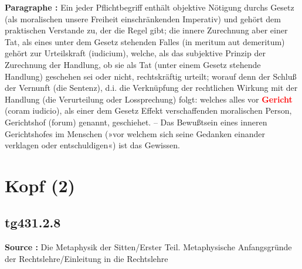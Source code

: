 \documentclass[a4paper,12pt,twoside]{book}
\newcommand{\match}[1]{\textcolor{red}{\textbf{#1}}}
\newcommand{\unnumberedsection}[1]{
	\section*{#1}
	\addcontentsline{toc}{section}{#1}
	\markright{#1}
}
\begin{document}
	\textbf{Paragraphe : }Ein jeder Pflichtbegriff enthält objektive Nötigung durchs Gesetz (als moralischen unsere Freiheit einschränkenden Imperativ) und gehört dem praktischen Verstande zu, der die Regel gibt; die innere Zurechnung aber einer Tat, als eines unter dem Gesetz stehenden Falles (in meritum aut demeritum) gehört zur Urteilskraft (iudicium), welche, als das subjektive Prinzip der Zurechnung der Handlung, ob sie als Tat (unter einem Gesetz stehende Handlung) geschehen sei oder nicht, rechtskräftig urteilt; worauf denn der Schluß der Vernunft (die Sentenz), d.i. die Verknüpfung  der rechtlichen Wirkung mit der Handlung (die Verurteilung oder Lossprechung) folgt: welches alles vor \match{Gericht} (coram iudicio), als einer dem Gesetz Effekt verschaffenden moralischen Person, Gerichtshof (forum) genannt, geschiehet. – Das Bewußtsein eines inneren Gerichtshofes im Menschen (»vor welchem sich seine Gedanken einander verklagen oder entschuldigen«) ist das Gewissen. 
	
	\unnumberedsection{Kopf (2)} 
	\subsection*{tg431.2.8} 
	\textbf{Source : }Die Metaphysik der Sitten/Erster Teil. Metaphysische Anfangsgründe der Rechtslehre/Einleitung in die Rechtslehre\\  
	
\end{document}
